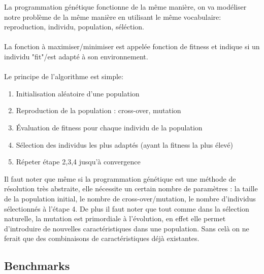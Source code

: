 \documentclass{report}
\begin{document}
La programmation génétique fonctionne de la même manière, on va
modéliser notre problème de la même manière en utilisant le même
vocabulaire: reproduction, individu, population, séléction.\\\\

La fonction à maximiser/minimiser est appelée fonction de fitness et
indique si un individu "fit"/est adapté à son environnement.\\\\

Le principe de l'algorithme est simple:
\begin{enumerate}
\item Initialisation aléatoire d'une population
\item Reproduction de la population : cross-over, mutation
\item \'Evaluation de fitness pour chaque individu de la population
\item Sélection des individus les plus adaptés (ayant la fitness la plus élevé)
\item Répeter étape 2,3,4 jusqu'à convergence
\end{enumerate}

Il faut noter que même si la programmation génétique est une méthode
de résolution très abstraite, elle nécessite un certain nombre de
paramètres : la taille de la population initial, le nombre de
cross-over/mutation, le nombre d'individus sélectionnés à l'étape 4.
De plus il faut noter que tout comme dans la sélection naturelle, la
mutation est primordiale à l'évolution, en effet elle permet
d'introduire de nouvelles caractéristiques dans une population. Sans
celà on ne ferait que des combinaisons de caractéristiques déjà
existantes.

\subsection{Benchmarks}
\end{document}
